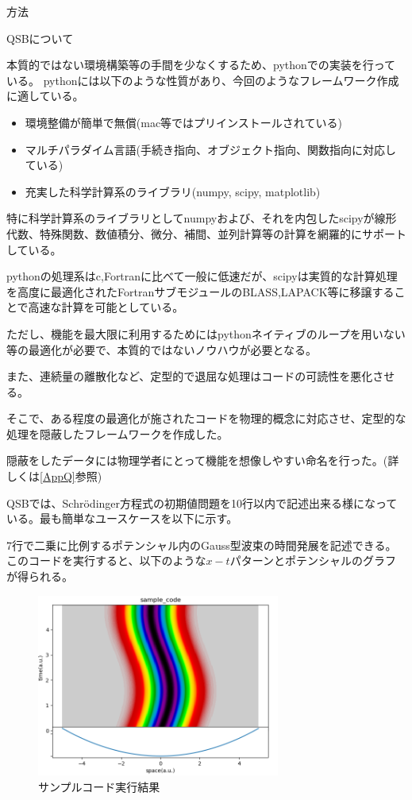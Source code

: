 \documentclass[a4paper, lualatex]{bxjsarticle}
\begin{document}
\begin{section}{方法}
\begin{subsection}{QSBについて}
    \par 本質的ではない環境構築等の手間を少なくするため、python\cite{python}での実装を行っている。
    pythonには以下のような性質があり、今回のようなフレームワーク作成に適している。
    \begin{itemize}
        \item 環境整備が簡単で無償(mac等ではプリインストールされている)
        \item マルチパラダイム言語(手続き指向、オブジェクト指向、関数指向に対応している)
        \item 充実した科学計算系のライブラリ(numpy, scipy, matplotlib)
    \end{itemize}
    \par 特に科学計算系のライブラリとしてnumpyおよび、それを内包したscip\cite{scipy}yが線形代数、特殊関数、数値積分、微分、補間、並列計算等の計算を網羅的にサポートしている。
    \par pythonの処理系はc,Fortranに比べて一般に低速だが、scipyは実質的な計算処理を高度に最適化されたFortranサブモジュールのBLASS,LAPACK等に移譲することで高速な計算を可能としている。
    \par ただし、機能を最大限に利用するためにはpythonネイティブのループを用いない等の最適化が必要で、本質的ではないノウハウが必要となる。
    \par また、連続量の離散化など、定型的で退屈な処理はコードの可読性を悪化させる。
    \par そこで、ある程度の最適化が施されたコードを物理的概念に対応させ、定型的な処理を隠蔽したフレームワークを作成した。
    \par 隠蔽をしたデータには物理学者にとって機能を想像しやすい命名を行った。(詳しくは\ref{AppQ}参照)
    \par QSBでは、Schrödinger方程式の初期値問題を10行以内で記述出来る様になっている。最も簡単なユースケースを以下に示す。
    
    7行で二乗に比例するポテンシャル内のGauss型波束の時間発展を記述できる。このコードを実行すると、以下のような$x-t$パターンとポテンシャルのグラフが得られる。
    \begin{figure}[h]
        \centering
        \includegraphics[width=8cm]{sample_code.png}
        \caption{サンプルコード実行結果}
    \end{figure}
    \end{subsection}
\end{section}
\end{document}
